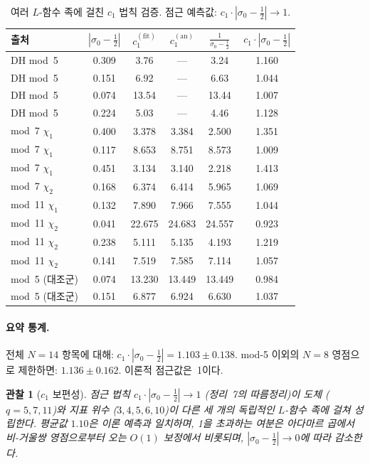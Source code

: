 \documentclass[11pt, a4paper]{article}
\theoremstyle{plain}
\newtheorem{observation}[theorem]{관찰}
\theoremstyle{definition}
\newcommand{\abs}[1]{\left|#1\right|}
\begin{document}
\begin{table}[ht]
\centering
\caption{여러 $L$-함수 족에 걸친 $c_{1}$ 법칙 검증.
  점근 예측값: $c_{1}\cdot\abs{\sigma_{0}-\frac{1}{2}} \to 1$.}
\label{tab:c1-comparison}
\begin{tabular}{@{}lccccc@{}}
\toprule
\textbf{출처} & $\abs{\sigma_{0}-\tfrac{1}{2}}$
  & $c_{1}^{(\mathrm{fit})}$ & $c_{1}^{(\mathrm{an})}$
  & $\frac{1}{\sigma_{0}-\frac{1}{2}}$
  & $c_{1}\!\cdot\!\abs{\sigma_{0}\!-\!\tfrac{1}{2}}$ \\
\midrule
DH mod~5 & 0.309 & 3.76 & --- & 3.24 & 1.160 \\
DH mod~5 & 0.151 & 6.92 & --- & 6.63 & 1.044 \\
DH mod~5 & 0.074 & 13.54 & --- & 13.44 & 1.007 \\
DH mod~5 & 0.224 & 5.03 & --- & 4.46 & 1.128 \\
\midrule
mod~7 $\chi_{1}$ & 0.400 & 3.378 & 3.384 & 2.500 & 1.351 \\
mod~7 $\chi_{1}$ & 0.117 & 8.653 & 8.751 & 8.573 & 1.009 \\
mod~7 $\chi_{1}$ & 0.451 & 3.134 & 3.140 & 2.218 & 1.413 \\
mod~7 $\chi_{2}$ & 0.168 & 6.374 & 6.414 & 5.965 & 1.069 \\
mod~11 $\chi_{1}$ & 0.132 & 7.890 & 7.966 & 7.555 & 1.044 \\
mod~11 $\chi_{2}$ & 0.041 & 22.675 & 24.683 & 24.557 & 0.923 \\
mod~11 $\chi_{2}$ & 0.238 & 5.111 & 5.135 & 4.193 & 1.219 \\
mod~11 $\chi_{2}$ & 0.141 & 7.519 & 7.585 & 7.114 & 1.057 \\
\midrule
mod~5 (대조군) & 0.074 & 13.230 & 13.449 & 13.449 & 0.984 \\
mod~5 (대조군) & 0.151 & 6.877 & 6.924 & 6.630 & 1.037 \\
\bottomrule
\end{tabular}
\end{table}

\paragraph{요약 통계.}
전체 $N=14$ 항목에 대해: $c_{1}\cdot\abs{\sigma_{0}-\tfrac{1}{2}} = 1.103 \pm 0.138$.
mod-5 이외의 $N=8$ 영점으로 제한하면: $1.136 \pm 0.162$.
이론적 점근값은~1이다.

\begin{observation}[$c_{1}$ 보편성]\label{obs:c1}
점근 법칙 $c_{1}\cdot\abs{\sigma_{0}-\tfrac{1}{2}} \to 1$
\textnormal{(}정리~7의 따름정리\textnormal{)}이 도체
\textnormal{(}$q=5,7,11$\textnormal{)}와 지표 위수
\textnormal{(}$3,4,5,6,10$\textnormal{)}이 다른 세 개의 독립적인
$L$-함수 족에 걸쳐 성립한다. 평균값 $1.10$은 이론 예측과 일치하며,
1을 초과하는 여분은 아다마르 곱에서 비-거울쌍 영점으로부터 오는
$O(1)$ 보정에서 비롯되며, $\abs{\sigma_{0}-\tfrac{1}{2}} \to 0$에
따라 감소한다.
\end{observation}
\end{document}
